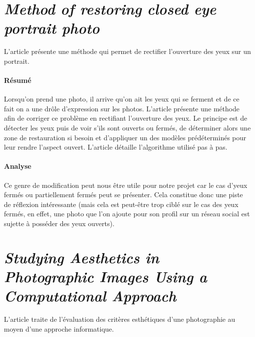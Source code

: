 \documentclass[11pt, french]{report-rd-info}
\begin{document}
\section{\emph{Method of restoring closed eye portrait photo}}
L'article \cite{Li2011} présente une méthode qui permet de rectifier l'ouverture des yeux sur un portrait.
\paragraph{Résumé}
Lorsqu'on prend une photo, il arrive qu'on ait les yeux qui se ferment et de ce fait on a une drôle d'expression sur les photos. L'article présente une méthode afin de corriger ce problème en rectifiant l'ouverture des yeux.
Le principe est de détecter les yeux puis de voir s'ils sont ouverts ou fermés, de déterminer alors une zone de restauration si besoin et d'appliquer un des modèles prédéterminés pour leur rendre l'aspect ouvert.
L'article détaille l'algorithme utilisé pas à pas.
\paragraph{Analyse}
Ce genre de modification peut nous être utile pour notre projet car le cas d'yeux fermés ou partiellement fermés peut se présenter. Cela constitue donc une piste de réflexion intéressante (mais cela est peut-être trop ciblé sur le cas des yeux fermés, en effet, une photo que l'on ajoute pour son profil sur un réseau social est sujette à posséder des yeux ouverts).
\section{\emph{Studying Aesthetics in Photographic Images Using a Computational Approach}}
L'article \cite{Datta} traite de l'évaluation des critères esthétiques d'une photographie au moyen d'une approche informatique.
\end{document}
